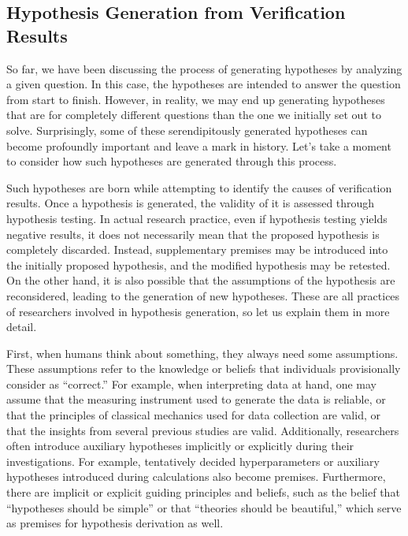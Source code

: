 \documentclass{book}
\begin{document}

\subsection{Hypothesis Generation from Verification Results}
So far, we have been discussing the process of generating hypotheses by analyzing a given question. In this case, the hypotheses are intended to answer the question from start to finish. However, in reality, we may end up generating hypotheses that are for completely different questions than the one we initially set out to solve. Surprisingly, some of these serendipitously generated hypotheses can become profoundly important and leave a mark in history. Let's take a moment to consider how such hypotheses are generated through this process.

Such hypotheses are born while attempting to identify the causes of verification results. Once a hypothesis is generated, the validity of it is assessed through hypothesis testing. In actual research practice, even if hypothesis testing yields negative results, it does not necessarily mean that the proposed hypothesis is completely discarded. Instead, supplementary premises may be introduced into the initially proposed hypothesis, and the modified hypothesis may be retested. On the other hand, it is also possible that the assumptions of the hypothesis are reconsidered, leading to the generation of new hypotheses. These are all practices of researchers involved in hypothesis generation, so let us explain them in more detail.

First, when humans think about something, they always need some assumptions. These assumptions refer to the knowledge or beliefs that individuals provisionally consider as ``correct.'' For example, when interpreting data at hand, one may assume that the measuring instrument used to generate the data is reliable, or that the principles of classical mechanics used for data collection are valid, or that the insights from several previous studies are valid. Additionally, researchers often introduce auxiliary hypotheses implicitly or explicitly during their investigations. For example, tentatively decided hyperparameters or auxiliary hypotheses introduced during calculations also become premises. Furthermore, there are implicit or explicit guiding principles and beliefs, such as the belief that ``hypotheses should be simple'' or that ``theories should be beautiful,'' which serve as premises for hypothesis derivation as well.
\end{document}
